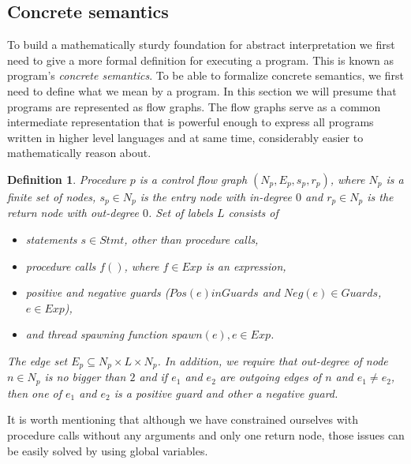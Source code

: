 \documentclass[..thesis.tex]{subfiles}
\newtheorem{defin}{Definition}[section]
\begin{document}
\subsection{Concrete semantics}

To build a mathematically sturdy foundation for abstract interpretation we first need to give a more formal definition for executing a program.
This is known as program's \emph{concrete semantics}.
To be able to formalize concrete semantics, we first need to define what we mean by a program. In this section we will presume that programs are represented as flow graphs.
The flow graphs serve as a common intermediate representation that is powerful enough to express all programs written in higher level languages and at same time,
considerably easier to mathematically reason about.

\begin{defin}
Procedure $p$ is a \textit{control flow graph} $\left( N_p,E_p,s_p,r_p \right)$, where $N_p$ is a finite set of nodes, $s_p \in N_p$
is the \textit{entry} node with in-degree $0$ and  $r_p \in N_p$ is the \textit{return} node with out-degree $0$. Set of labels $L$ consists of
\begin{itemize}
\item statements $s \in Stmt$, other than procedure calls,
\item procedure calls $f()$, where $f \in Exp$ is an expression, 
\item positive and negative guards ($Pos\left( e \right) in Guards$ and $Neg \left( e \right) \in Guards$, $e \in Exp$),
\item and thread spawning function $spawn\left( e \right), e \in Exp$.  
\end{itemize}
The edge set  $E_p \subseteq N_p \times L \times N_p$. In addition, we require that out-degree of node $n \in N_p$ is no bigger than $2$ 
and if $e_1$ and $e_2$ are outgoing edges of $n$ and $e_1 \neq e_2$, then one of $e_1$ and $e_2$ is a positive guard and other a negative guard. 
\end{defin}

It is worth mentioning that although we have constrained ourselves with procedure calls without any arguments and only one return node,
 those issues can be easily solved by using global variables. 
\end{document}
